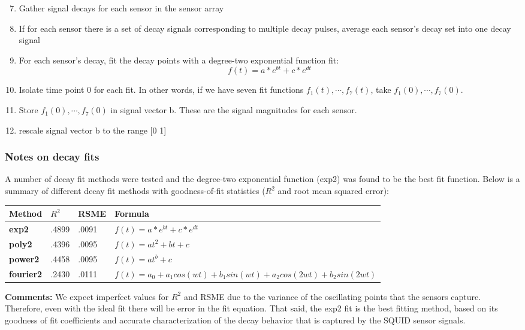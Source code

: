 \documentclass[a4paper]{article}
\begin{document}
\begin{enumerate}
\setcounter{enumi}{6}
\item Gather signal decays for each sensor in the sensor array
\item If for each sensor there is a set of decay signals corresponding to multiple decay pulses, average each sensor's decay set into one decay signal
\item For each sensor's decay, fit the decay points with a degree-two exponential function fit: 
\[
f(t) = a*e^{bt} + c*e^{dt}
\]
\item Isolate time point 0 for each fit. In other words, if we have seven fit functions $f_1(t), \cdots, f_7(t)$, take $f_1(0), \cdots, f_7(0)$. 
\item Store $f_1(0), \cdots, f_7(0)$ in signal vector b. These are the signal magnitudes for each sensor.
\item rescale signal vector b to the range [0 1]
\end{enumerate}

\subsubsection*{Notes on decay fits}
A number of decay fit methods were tested and the degree-two exponential function (exp2) was found to be the best fit function. Below is a summary of different decay fit methods with goodness-of-fit statistics ($R^2$ and root mean squared error):

\renewcommand{\arraystretch}{1.5}%
\begin{center}
    \begin{tabular}{ | l | l | l | p{5cm} |}
    \hline
    Method & $R^{2}$ & RSME & Formula \\ \hline
    \textbf{exp2}  & .4899 & .0091 & $f(t) = a*e^{bt} + c*e^{dt}$ \\ \hline
    \textbf{poly2}  & .4396 & .0095 & $f(t) = at^{2} + bt + c$ \\ \hline    				
    \textbf{power2}  & .4458 & .0095 & $f(t) = at^{b} + c$\\ \hline    				
    \textbf{fourier2}  & .2430 & .0111 & $f(t) = a_0 + a_1cos(wt) + b_1sin(wt) + a_2cos(2wt) + b_2sin(2wt)$ \\ \hline
    \end{tabular}
\end{center}

\textbf{Comments:} We expect imperfect values for $R^{2}$ and RSME due to the variance of the oscillating points that the sensors capture. Therefore, even with the ideal fit there will be error in the fit equation. That said, the exp2 fit is the best fitting method, based on its goodness of fit coefficients and accurate characterization of the decay behavior that is captured by the SQUID sensor signals. 
\end{document}
